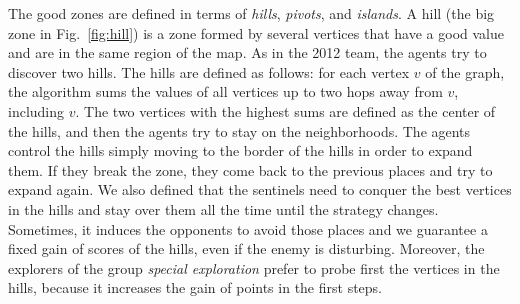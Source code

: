 The good zones are defined in terms of \emph{hills}, \emph{pivots}, and \emph{islands}. A hill (the big zone in Fig.~\ref{fig:hill}) is a zone formed by several vertices that have a good value and are in the same region of the map. As in the 2012 team, the agents try to discover two hills. The hills are defined as follows: for each vertex $v$ of the graph, the algorithm sums the values of all vertices up to two hops away from $v$, including $v$. The two vertices with the highest sums are defined as the center of the hills, and then the agents try to stay on the neighborhoods. The agents control the hills simply moving to the border of the hills in order to expand them. If they break the zone, they come back to the previous places and try to expand again. We also defined that the sentinels need to conquer the best vertices in the hills and stay over them all the time until the strategy changes. Sometimes, it induces the opponents to avoid those places and we guarantee a fixed gain of scores of the hills, even if the enemy is disturbing. Moreover, the explorers of the group \emph{special exploration} prefer to probe first the vertices in the hills, because it increases the gain of points in the first steps.


